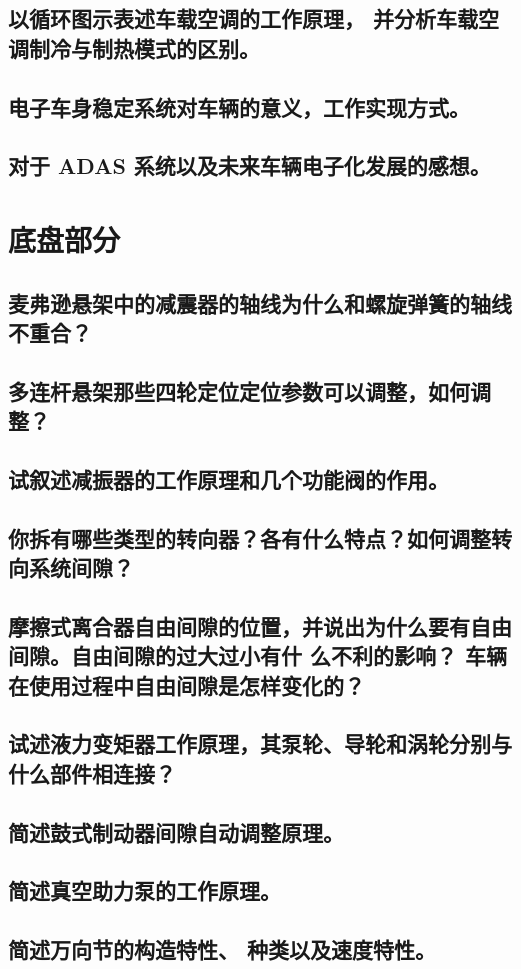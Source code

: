 \documentclass[UTF8]{ctexart}
\numberwithin{figure}{section}
\numberwithin{table}{section}
\begin{document}
\subsection{以循环图示表述车载空调的工作原理， 并分析车载空调制冷与制热模式的区别。}
\subsection{电子车身稳定系统对车辆的意义，工作实现方式。}
\subsection{对于 ADAS 系统以及未来车辆电子化发展的感想。}
\newpage

\section{底盘部分}
\subsection{麦弗逊悬架中的减震器的轴线为什么和螺旋弹簧的轴线不重合？}
\subsection{多连杆悬架那些四轮定位定位参数可以调整，如何调整？}
\subsection{试叙述减振器的工作原理和几个功能阀的作用。}
\subsection{你拆有哪些类型的转向器？各有什么特点？如何调整转向系统间隙？}
\subsection{摩擦式离合器自由间隙的位置，并说出为什么要有自由间隙。自由间隙的过大过小有什
	么不利的影响？ 车辆在使用过程中自由间隙是怎样变化的？}
\subsection{试述液力变矩器工作原理，其泵轮、导轮和涡轮分别与什么部件相连接？}
\subsection{简述鼓式制动器间隙自动调整原理。}
\subsection{简述真空助力泵的工作原理。}
\subsection{简述万向节的构造特性、 种类以及速度特性。}
\newpage
\end{document}
